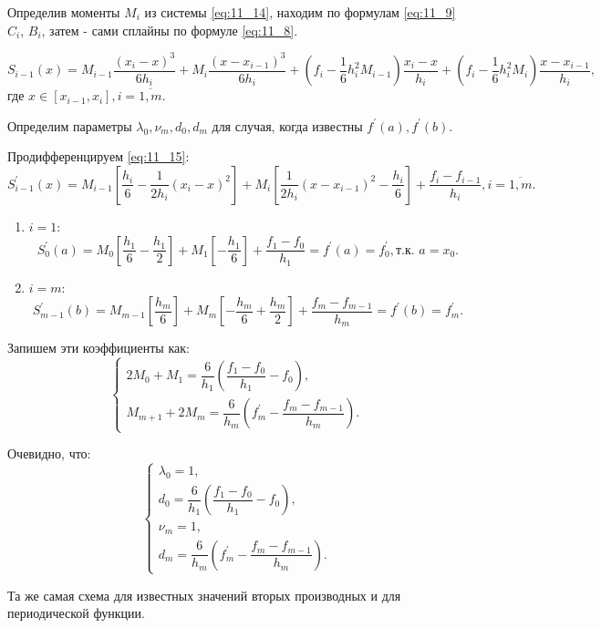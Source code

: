 Определив моменты $M_i$ из системы \eqref{eq:11_14}, находим по формулам \eqref{eq:11_9} $C_i$, $B_i$, затем - сами сплайны по формуле \eqref{eq:11_8}.

\begin{equation}\label{eq:11_15}
  S_{i - 1}(x) = M_{i - 1} \dfrac{(x_i - x)^3}{6 h_i} + M_i \dfrac{(x - x_{i-1})^3}{6 h_i} + \left( f_i - \frac{1}{6} h_i^2 M_{i-1} \right) \dfrac{x_i-x}{h_i} + \left( f_i - \frac{1}{6} h_i^2 M_i \right) \dfrac{x - x_{i-1}}{h_i},
\end{equation}
где $x \in [x_{i-1}, x_i], i = \overline{1, m}$.

Определим параметры $\lambda_0, \nu_m, d_0, d_m$ для случая, когда известны $f^{'}(a), f^{'}(b)$.

Продифференцируем \eqref{eq:11_15}:
\begin{equation}\label{eq:11_16}
  S^{'}_{i - 1}(x) = M_{i - 1} \left[ \dfrac{h_i}{6} - \dfrac{1}{2 h_i} (x_i - x)^2 \right] + M_i \left[\dfrac{1}{2 h_i} (x - x_{i-1})^2 - \dfrac{h_i}{6} \right]   + \dfrac{f_i-f_{i-1}}{h_i}, i = \overline{1, m}.
\end{equation}

\begin{enumerate}
  \item $i = 1$:
  \begin{equation*}
  S^{'}_{0}(a) = M_{0} \left[ \dfrac{h_1}{6} - \dfrac{h_1}{2} \right] + M_1 \left[- \dfrac{h_1}{6} \right]   + \dfrac{f_1-f_{0}}{h_1} = f^{'}(a) = f^{'}_0, \text{т.к. $a = x_0$}.
  \end{equation*}
  \item $i = m$:
  \begin{equation*}
  S^{'}_{m-1}(b) = M_{m-1} \left[ \dfrac{h_m}{6} \right] + M_m \left[- \dfrac{h_m}{6} + \dfrac{h_m}{2}\right]   + \dfrac{f_m-f_{m-1}}{h_m} = f^{'}(b) = f^{'}_m.
  \end{equation*}
\end{enumerate}

Запишем эти коэффициенты как:
\begin{equation*}
  \begin{cases}
    2 M_0 + M_1 = \dfrac{6}{h_1} \left( \dfrac{f_1 - f_0}{h_1} - f_0 \right), \\
    M_{m + 1} + 2 M_m = \dfrac{6}{h_m} \left(f^{'}_m - \dfrac{f_m - f_{m-1}}{h_m} \right).
  \end{cases}
\end{equation*}

Очевидно, что:
\begin{equation*}
  \begin{cases}
    \lambda_0 = 1, \\
    d_0 = \dfrac{6}{h_1} \left( \dfrac{f_1 - f_0}{h_1} - f_0 \right), \\
    \nu_m = 1, \\
    d_m =  \dfrac{6}{h_m} \left(f^{'}_m - \dfrac{f_m - f_{m-1}}{h_m} \right).
  \end{cases}
\end{equation*}

Та же самая схема для известных значений вторых производных и для периодической функции.
